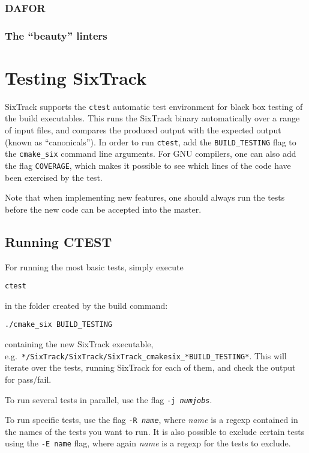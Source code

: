 \documentclass[english,BCOR=0mm,DIV=18]{scrartcl}
\begin{document}
\subsubsection{DAFOR}

\subsubsection{The ``beauty'' linters}


\section{Testing SixTrack}
\label{sec:testing}
SixTrack supports the \texttt{ctest} automatic test environment for black box testing of the build executables.
This runs the SixTrack binary automatically over a range of input files, and compares the produced output with the expected output (known as ``canonicals'').
In order to run \texttt{ctest}, add the \texttt{BUILD\_TESTING} flag to the \texttt{cmake\_six} command line arguments.
For GNU compilers, one can also add the flag \texttt{COVERAGE}, which makes it possible to see which lines of the code have been exercised by the test.

Note that when implementing new features, one should always run the tests before the new code can be accepted into the master.

\subsection{Running CTEST}
For running the most basic tests, simply execute
\begin{lstlisting}
ctest
\end{lstlisting}
in the folder created by the build command:
\begin{lstlisting}
./cmake_six BUILD_TESTING
\end{lstlisting}
containing the new SixTrack executable, e.g.\ \texttt{*/SixTrack/\-SixTrack/\-SixTrack\-\_cmakesix\-\_*BUILD\-\_TEST\-ING*}.
This will iterate over the tests, running SixTrack for each of them, and check the output for pass/fail.

To run several tests in parallel, use the flag \texttt{-j \textit{numjobs}}.

To run specific tests, use the flag \texttt{-R \textit{name}}, where \textit{name} is a regexp contained in the names of the tests you want to run.
It is also possible to exclude certain tests using the \texttt{-E \texttt{name}} flag, where again \textit{name} is a regexp for the tests to exclude.
\end{document}
